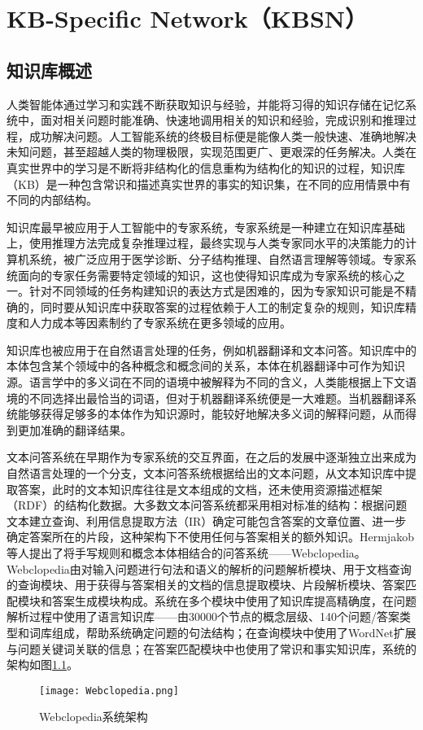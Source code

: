 \chapter{KB-Specific Network（KBSN）}
\section{知识库概述}
人类智能体通过学习和实践不断获取知识与经验，并能将习得的知识存储在记忆系统中，面对相关问题时能准确、快速地调用相关的知识和经验，完成识别和推理过程，成功解决问题。人工智能系统的终极目标便是能像人类一般快速、准确地解决未知问题，甚至超越人类的物理极限，实现范围更广、更艰深的任务解决。人类在真实世界中的学习是不断将非结构化的信息重构为结构化的知识的过程，知识库（KB）是一种包含常识和描述真实世界的事实的知识集，在不同的应用情景中有不同的内部结构。

知识库最早被应用于人工智能中的专家系统，专家系统是一种建立在知识库基础上，使用推理方法完成复杂推理过程，最终实现与人类专家同水平的决策能力的计算机系统，被广泛应用于医学诊断、分子结构推理、自然语言理解等领域。专家系统面向的专家任务需要特定领域的知识，这也使得知识库成为专家系统的核心之一。针对不同领域的任务构建知识的表达方式是困难的，因为专家知识可能是不精确的，同时要从知识库中获取答案的过程依赖于人工的制定复杂的规则，知识库精度和人力成本等因素制约了专家系统在更多领域的应用。

知识库也被应用于在自然语言处理的任务，例如机器翻译和文本问答。知识库中的本体包含某个领域中的各种概念和概念间的关系，本体在机器翻译中可作为知识源。语言学中的多义词在不同的语境中被解释为不同的含义，人类能根据上下文语境的不同选择出最恰当的词语，但对于机器翻译系统便是一大难题。当机器翻译系统能够获得足够多的本体作为知识源时，能较好地解决多义词的解释问题，从而得到更加准确的翻译结果。

文本问答系统在早期作为专家系统的交互界面，在之后的发展中逐渐独立出来成为自然语言处理的一个分支，文本问答系统根据给出的文本问题，从文本知识库中提取答案，此时的文本知识库往往是文本组成的文档，还未使用资源描述框架（RDF）的结构化数据。大多数文本问答系统都采用相对标准的结构：根据问题文本建立查询、利用信息提取方法（IR）确定可能包含答案的文章位置、进一步确定答案所在的片段，这种架构下不使用任何与答案相关的额外知识。Hermjakob等人提出了将手写规则和概念本体相结合的问答系统——Webclopedia。Webclopedia由对输入问题进行句法和语义的解析的问题解析模块、用于文档查询的查询模块、用于获得与答案相关的文档的信息提取模块、片段解析模块、答案匹配模块和答案生成模块构成。系统在多个模块中使用了知识库提高精确度，在问题解析过程中使用了语言知识库——由30000个节点的概念层级、140个问题/答案类型和词库组成，帮助系统确定问题的句法结构；在查询模块中使用了WordNet扩展与问题关键词关联的信息；在答案匹配模块中也使用了常识和事实知识库，系统的架构如图\ref{Webclopedia}。
\begin{figure}[H]
	\centering
	\texttt{[image: Webclopedia.png]}
	\caption{Webclopedia系统架构}
	\label{Webclopedia}
\end{figure}

